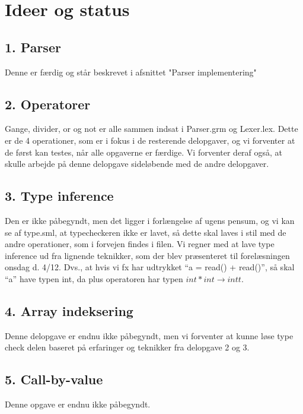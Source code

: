 \documentclass[11pt,a4paper]{article}
\begin{document}
\section*{Ideer og status}
\subsection*{1. Parser}
Denne er færdig og står beskrevet i afsnittet "Parser implementering"
\subsection*{2. Operatorer}
Gange, divider, or og not er alle sammen indsat i Parser.grm og Lexer.lex.
Dette er de 4 operationer, som er i fokus i de resterende delopgaver,
og vi forventer at de først kan testes, når alle opgaverne er færdige.
Vi forventer deraf også, at skulle arbejde på denne delopgave sideløbende
med de andre delopgaver.
\subsection*{3. Type inference}
Den er ikke påbegyndt, men det ligger i forlængelse af ugens pensum, og vi kan se af type.sml,
at typecheckeren ikke er lavet, så dette skal laves i stil med de andre operationer,
som i forvejen findes i filen. Vi regner med at lave type inference ud fra
lignende teknikker, som der blev præsenteret til forelæsningen onsdag d. 4/12.
Dvs., at hvis vi fx har udtrykket ``a = read() + read()'', så skal ``a'' have typen
int, da plus operatoren har typen $int * int \rightarrow intt$.
\subsection*{4. Array indeksering}
Denne delopgave er endnu ikke påbegyndt, men vi forventer
at kunne løse type check delen baseret på erfaringer og
teknikker fra delopgave 2 og 3.
\subsection*{5. Call-by-value}
Denne opgave er endnu ikke påbegyndt.
\end{document}
